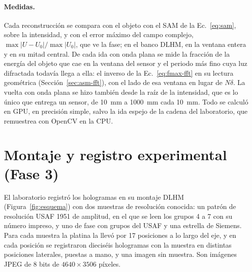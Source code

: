 \paragraph{Medidas.} Cada reconstrucción se compara con el objeto con el SAM
de la Ec.~\eqref{eq:sam}, sobre la intensidad, y con el error máximo del campo
complejo, $\max|U - U_0|/\max|U_0|$, que ve la fase; en el banco DLHM, en la
ventana entera y en su mitad central. De cada ida con onda plana se mide la
fracción de la energía del objeto que cae en la ventana del sensor y el
periodo más fino cuya luz difractada todavía llega a ella: el inverso de la
Ec.~\eqref{eq:fmax-fft} en su lectura geométrica
(Sección~\ref{sec:asm-fft}), con el lado de esa ventana en lugar de
$N\delta$. La vuelta con onda plana se hizo también desde la raíz de la
intensidad, que es lo único que entrega un sensor, de \SI{10}{mm} a
\SI{1000}{mm} cada \SI{10}{mm}. Todo se calculó en GPU, en precisión simple,
salvo la ida espejo de la cadena del laboratorio, que remuestrea con OpenCV en
la CPU.

\section{Montaje y registro experimental (Fase 3)}
\label{sec:montaje}

El laboratorio registró los hologramas en su montaje DLHM
(Figura~\ref{fig:esquema}) con dos muestras de resolución conocida: un
patrón de resolución USAF 1951 de amplitud, en el que se leen los grupos 4 a 7 con su
número impreso, y uno de fase con grupos del USAF y una estrella de Siemens.
Para cada muestra la platina la llevó por 17 posiciones a lo largo del eje, y
en cada posición se registraron dieciséis hologramas con la muestra en
distintas posiciones laterales, puestas a mano, y una imagen sin muestra. Son
imágenes JPEG de 8 bits de $4640\times3506$ píxeles.

